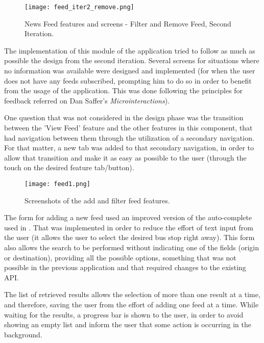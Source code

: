 \begin{figure}[H]
  \begin{center}
    \leavevmode
    \texttt{[image: feed\_iter2\_remove.png]}
    \caption{News Feed features and screens - Filter and Remove Feed, Second Iteration.}
    \label{fig:feed_iter2_remove}
  \end{center}
\end{figure} 

The implementation of this module of the application tried to follow as much as possible the design from the second iteration. Several screens for situations where no information was available were designed and implemented (for when the user does not have any feeds subscribed, prompting him to do so in order to benefit from the usage of the application. This was done following the principles for feedback referred on Dan Saffer's \emph{Microinteractions}\cite{kn:Saf13}).

One question that was not considered in the design phase was the transition between the 'View Feed' feature and the other features in this component, that had navigation between them through the utilization of a secondary navigation. For that matter, a new tab was added to that secondary navigation, in order to allow that transition and make it as easy as possible to the user (through the touch on the desired feature tab/button).

\begin{figure}[!h]
  \begin{center}
    \leavevmode
    \texttt{[image: feed1.png]}
    \caption{Screenshots of the add and filter feed features.}
    \label{fig:feed1}
  \end{center}
\end{figure}

The form for adding a new feed used an improved version of the auto-complete used in \cite{kn:eSG12}. That was implemented in order to reduce the effort of text input from the user (it allows the user to select the desired bus stop right away). This form also allows the search to be performed without indicating one of the fields (origin or destination), providing all the possible options, something that was not possible in the previous application and that required changes to the existing API.

The list of retrieved results allows the selection of more than one result at a time, and therefore, saving the user from the effort of adding one feed at a time.
While waiting for the results, a progress bar is shown to the user, in order to avoid showing an empty list and inform the user that some action is occurring in the background.

